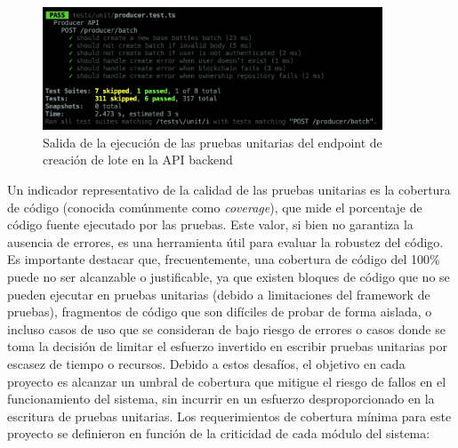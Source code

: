 \begin{figure}[!htb]
	\centering
	\includegraphics[width=0.9\textwidth]{Figures/unit-test-api-results.png}
	\caption{Salida de la ejecución de las pruebas unitarias del endpoint de creación de lote en la API backend}
	\label{fig:unit-test-api-results}
\end{figure}

Un indicador representativo de la calidad de las pruebas unitarias es la cobertura de código (conocida comúnmente como \textit{coverage}), que mide el porcentaje de código fuente ejecutado por las pruebas. Este valor, si bien no garantiza la ausencia de errores, es una herramienta útil para evaluar la robustez del código. Es importante destacar que, frecuentemente, una cobertura de código del 100\% puede no ser alcanzable o justificable, ya que existen bloques de código que no se pueden ejecutar en pruebas unitarias (debido a limitaciones del framework de pruebas), fragmentos de código que son difíciles de probar de forma aislada, o incluso casos de uso que se consideran de bajo riesgo de errores o casos donde se toma la decisión de limitar el esfuerzo invertido en escribir pruebas unitarias por escasez de tiempo o recursos. Debido a estos desafíos, el objetivo en cada proyecto es alcanzar un umbral de cobertura que mitigue el riesgo de fallos en el funcionamiento del sistema, sin incurrir en un esfuerzo desproporcionado en la escritura de pruebas unitarias. Los requerimientos de cobertura mínima para este proyecto se definieron en función de la criticidad de cada módulo del sistema:

